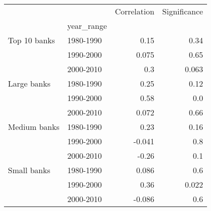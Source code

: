\begin{tabular}{llrr}
\toprule
            &           &  Correlation &  Significance \\
{} & year\_range &              &               \\
\midrule
Top 10 banks & 1980-1990 &         0.15 &          0.34 \\
            & 1990-2000 &        0.075 &          0.65 \\
            & 2000-2010 &          0.3 &         0.063 \\
Large banks & 1980-1990 &         0.25 &          0.12 \\
            & 1990-2000 &         0.58 &           0.0 \\
            & 2000-2010 &        0.072 &          0.66 \\
Medium banks & 1980-1990 &         0.23 &          0.16 \\
            & 1990-2000 &       -0.041 &           0.8 \\
            & 2000-2010 &        -0.26 &           0.1 \\
Small banks & 1980-1990 &        0.086 &           0.6 \\
            & 1990-2000 &         0.36 &         0.022 \\
            & 2000-2010 &       -0.086 &           0.6 \\
\bottomrule
\end{tabular}
